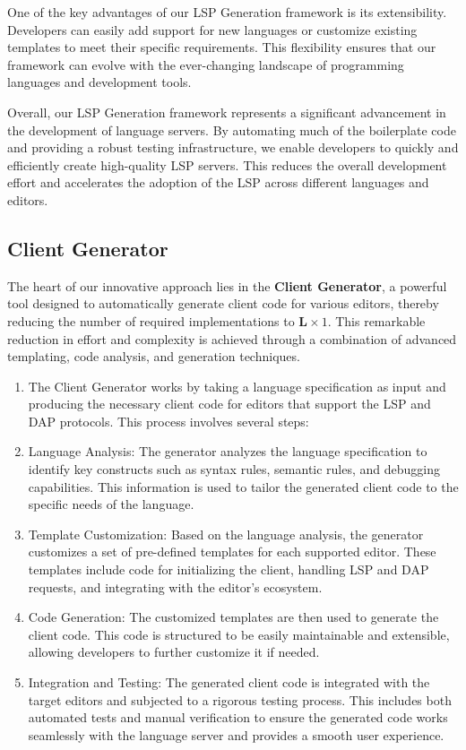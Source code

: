 One of the key advantages of our LSP Generation framework is its extensibility. Developers can easily add support for new languages or customize existing templates to meet their specific requirements. This flexibility ensures that our framework can evolve with the ever-changing landscape of programming languages and development tools.

Overall, our LSP Generation framework represents a significant advancement in the development of language servers. By automating much of the boilerplate code and providing a robust testing infrastructure, we enable developers to quickly and efficiently create high-quality LSP servers. This reduces the overall development effort and accelerates the adoption of the LSP across different languages and editors.

\subsection{Client Generator}\label{subsec:concept:ClientGenerator}

The heart of our innovative approach lies in the \textbf{Client Generator}, a powerful tool designed to automatically generate client code for various editors, thereby reducing the number of required implementations to $\mathbf{L} \times 1$. This remarkable reduction in effort and complexity is achieved through a combination of advanced templating, code analysis, and generation techniques.

\begin{enumerate}
\item The Client Generator works by taking a language specification as input and producing the necessary client code for editors that support the LSP and DAP protocols. This process involves several steps:
\item Language Analysis: The generator analyzes the language specification to identify key constructs such as syntax rules, semantic rules, and debugging capabilities. This information is used to tailor the generated client code to the specific needs of the language.
\item Template Customization: Based on the language analysis, the generator customizes a set of pre-defined templates for each supported editor. These templates include code for initializing the client, handling LSP and DAP requests, and integrating with the editor's ecosystem.
\item Code Generation: The customized templates are then used to generate the client code. This code is structured to be easily maintainable and extensible, allowing developers to further customize it if needed.
\item Integration and Testing: The generated client code is integrated with the target editors and subjected to a rigorous testing process. This includes both automated tests and manual verification to ensure the generated code works seamlessly with the language server and provides a smooth user experience.
\end{enumerate}

